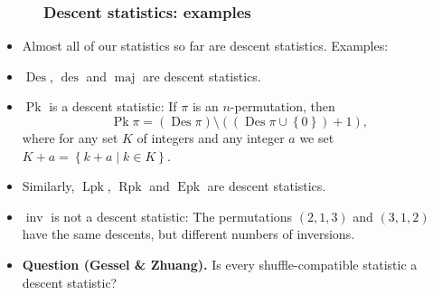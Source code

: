 \documentclass{beamer}
\newcommand{\Lpk}{\operatorname{Lpk}}
\newcommand{\Rpk}{\operatorname{Rpk}}
\newcommand{\Pk}{\operatorname{Pk}}
\newcommand{\Epk}{\operatorname{Epk}}
\newcommand{\Des}{\operatorname{Des}}
\newcommand{\des}{\operatorname{des}}
\newcommand{\inv}{\operatorname{inv}}
\newcommand{\maj}{\operatorname{maj}}
\newcommand{\fti}[1]{\frametitle{\ \ \ \ \ #1}}
\newcommand{\set}[1]{\left\{ #1 \right\}}
\newcommand{\tup}[1]{\left( #1 \right)}
\newcommand{\defn}[1]{{\color{darkred}\emph{#1}}} %
\theoremstyle{plain}
\begin{document}
\begin{frame}
\fti{Descent statistics: examples}

\begin{itemize}

\item Almost all of our statistics so far are descent statistics.
     Examples:

\pause

\item $\Des$, $\des$ and $\maj$ are descent statistics.

\pause

\item $\Pk$ is a descent statistic: If $\pi$ is an $n$-permutation,
      then
      \[
      \Pk \pi = \tup{\Des \pi} \setminus \tup{\tup{\Des \pi \cup \set{0}} + 1} ,
      \]
      where for any set $K$ of integers and any integer $a$
      we set \defn{$K + a = \set{k + a \mid k \in K}$}.

\item Similarly, $\Lpk$, $\Rpk$ and $\Epk$ are descent statistics.

\pause

\item $\inv$ is not a descent statistic:
      The permutations $\tup{2,1,3}$ and $\tup{3,1,2}$ have the same
      descents, but different numbers of inversions.

\pause

\item \textbf{Question (Gessel \& Zhuang).}
      Is every shuffle-compatible statistic a descent statistic?

\end{itemize}

\end{frame}
\end{document}
